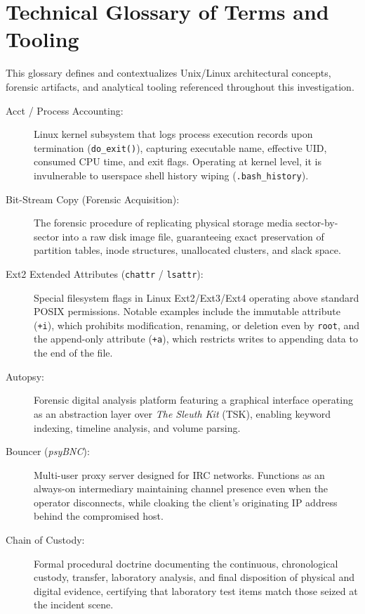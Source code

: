 \chapter{Technical Glossary of Terms and Tooling}
\label{apendice:glosario}

This glossary defines and contextualizes Unix/Linux architectural concepts, forensic artifacts, and analytical tooling referenced throughout this investigation.

\begin{description}
    \item[Acct / Process Accounting:] Linux kernel subsystem that logs process execution records upon termination (\texttt{do\_exit()}), capturing executable name, effective UID, consumed CPU time, and exit flags. Operating at kernel level, it is invulnerable to userspace shell history wiping (\texttt{.bash\_history}).

    \item[Bit-Stream Copy (Forensic Acquisition):] The forensic procedure of replicating physical storage media sector-by-sector into a raw disk image file, guaranteeing exact preservation of partition tables, inode structures, unallocated clusters, and slack space.

    \item[Ext2 Extended Attributes (\texttt{chattr} / \texttt{lsattr}):] Special filesystem flags in Linux Ext2/Ext3/Ext4 operating above standard POSIX permissions. Notable examples include the immutable attribute (\texttt{+i}), which prohibits modification, renaming, or deletion even by \texttt{root}, and the append-only attribute (\texttt{+a}), which restricts writes to appending data to the end of the file.

    \item[Autopsy:] Forensic digital analysis platform featuring a graphical interface operating as an abstraction layer over \textit{The Sleuth Kit} (TSK), enabling keyword indexing, timeline analysis, and volume parsing.

    \item[Bouncer (\textit{psyBNC}):] Multi-user proxy server designed for IRC networks. Functions as an always-on intermediary maintaining channel presence even when the operator disconnects, while cloaking the client's originating IP address behind the compromised host.

    \item[Chain of Custody:] Formal procedural doctrine documenting the continuous, chronological custody, transfer, laboratory analysis, and final disposition of physical and digital evidence, certifying that laboratory test items match those seized at the incident scene.


\end{description}
